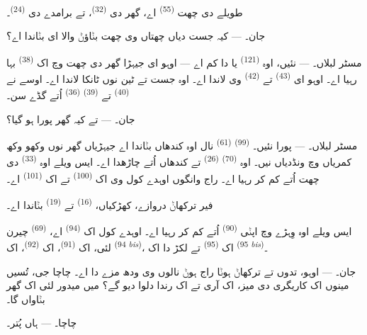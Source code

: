 طویلے دی چھت  \textsuperscript{(55)} اے، گھر دی
 \textsuperscript{(32)}، تے برامدے دی 
\textsuperscript{(24)}۔

\textsc{جان}۔ --- کیہ جست دیاں چھتاں وی چھت بݨاؤݨ والا ای بݨاندا اے؟

\textsc{مسٹر لبلاں}۔ --- نئیں، اوہ  \textsuperscript{(121)} یا
 دا کم اے — اوہو ای جیہڑا گھر دی چھت وچ اک
 \textsuperscript{(38)} بہا رہیا اے۔ اوہو ای
 \textsuperscript{(43)} تے 
\textsuperscript{(42)} وی لاندا اے۔ اوہ جست تے ٹین نوں ٹانکا لاندا اے۔ اوسے نے
 \textsuperscript{(40)} تے  \textsuperscript{(39)}
 \textsuperscript{(36)} اُتے گڈے سن۔

\textsc{جان}۔ --- تے کیہ گھر پورا ہو گیا؟

\VUsaut{3.0mm}
\VUsaut{3.0mm}

\textsc{مسٹر لبلاں}۔ --- پورا نئیں۔  \textsuperscript{(99)}
 \textsuperscript{(61)} نال اوہ کندھاں بݨاندا اے جیہڑیاں گھر نوں وکھو
وکھ کمریاں وچ ونڈدیاں نیں۔ اوہ  \textsuperscript{(70)}
 \textsuperscript{(26)} تے کندھاں اُتے چاڑھدا اے۔ ایس ویلے اوہ
 \textsuperscript{(33)} دی چھت اُتے کم کر رہیا اے۔ راج وانگوں اوہدے
کول وی اک  \textsuperscript{(100)} تے اک 
\textsuperscript{(101)} اے۔

فیر ترکھاݨ دروازے، کھڑکیاں،  \textsuperscript{(16)} تے
 \textsuperscript{(19)} بݨاندا اے۔

ایس ویلے اوہ وِہڑے وچ اپݨی  \textsuperscript{(90)} اُتے کم
کر رہیا اے۔ اوہدے کول اک  \textsuperscript{(94)} اے، 
\textsuperscript{(69)} چیرن لئی، اک  \textsuperscript{(91)}، اک
 \textsuperscript{(92)}، اک 
\textsuperscript{(94 \textit{bis})}، اک  \textsuperscript{(95)} تے
لکڑ دا اک  \textsuperscript{(95 \textit{bis})}۔

\textsc{جان}۔ --- اوہو، تدوں تے ترکھاݨ ہوݨا راج ہوݨ نالوں وی ودھ مزے دا اے۔ چاچا
جی، تُسیں مینوں اک کاریگری دی میز، اک آری تے اک رندا دلوا دیو گے؟ میں میدور لئی
اک گھر بݨاواں گا۔

\textsc{چاچا}۔ --- ہاں پُتر۔

